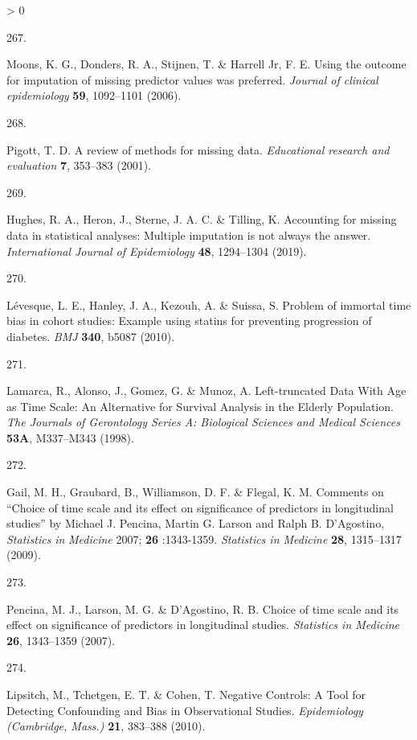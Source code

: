 \documentclass[a4paper, twoside]{templates/ociamthesis}
\newlength{\cslhangindent}
\newlength{\csllabelwidth}
\newenvironment{CSLReferences}[3] %
 {%
  \setlength{\parindent}{0pt}
  \ifodd #1 \everypar{\setlength{\hangindent}{\cslhangindent}}\ignorespaces\fi
  \ifnum #2 > 0
  \setlength{\parskip}{#2\baselineskip}
  \fi
 }%
 {}
\newcommand{\CSLLeftMargin}[1]{\parbox[t]{\maxof{\widthof{#1}}{\csllabelwidth}}{#1}}
\newcommand{\CSLRightInline}[1]{\parbox[t]{\linewidth - \csllabelwidth}{#1}}
\begin{document}
\begin{CSLReferences}{0}{0}
\leavevmode\hypertarget{ref-moons2006using}{}%
\CSLLeftMargin{267. }
\CSLRightInline{Moons, K. G., Donders, R. A., Stijnen, T. \& Harrell Jr, F. E. Using the outcome for imputation of missing predictor values was preferred. \emph{Journal of clinical epidemiology} \textbf{59}, 1092--1101 (2006).}

\leavevmode\hypertarget{ref-pigott2001review}{}%
\CSLLeftMargin{268. }
\CSLRightInline{Pigott, T. D. A review of methods for missing data. \emph{Educational research and evaluation} \textbf{7}, 353--383 (2001).}

\leavevmode\hypertarget{ref-hughes2019}{}%
\CSLLeftMargin{269. }
\CSLRightInline{Hughes, R. A., Heron, J., Sterne, J. A. C. \& Tilling, K. Accounting for missing data in statistical analyses: Multiple imputation is not always the answer. \emph{International Journal of Epidemiology} \textbf{48}, 1294--1304 (2019).}

\leavevmode\hypertarget{ref-levesque2010}{}%
\CSLLeftMargin{270. }
\CSLRightInline{Lévesque, L. E., Hanley, J. A., Kezouh, A. \& Suissa, S. Problem of immortal time bias in cohort studies: Example using statins for preventing progression of diabetes. \emph{BMJ} \textbf{340}, b5087 (2010).}

\leavevmode\hypertarget{ref-lamarca1998}{}%
\CSLLeftMargin{271. }
\CSLRightInline{Lamarca, R., Alonso, J., Gomez, G. \& Munoz, A. Left-truncated {Data With Age} as {Time Scale}: {An Alternative} for {Survival Analysis} in the {Elderly Population}. \emph{The Journals of Gerontology Series A: Biological Sciences and Medical Sciences} \textbf{53A}, M337--M343 (1998).}

\leavevmode\hypertarget{ref-gail2009}{}%
\CSLLeftMargin{272. }
\CSLRightInline{Gail, M. H., Graubard, B., Williamson, D. F. \& Flegal, K. M. Comments on {``{Choice} of time scale and its effect on significance of predictors in longitudinal studies''} by {Michael J}. {Pencina}, {Martin G}. {Larson} and {Ralph B}. {D}'{Agostino}, {\emph{Statistics}}{ \emph{in} }{\emph{Medicine}} 2007; {\textbf{26}} :1343-1359. \emph{Statistics in Medicine} \textbf{28}, 1315--1317 (2009).}

\leavevmode\hypertarget{ref-pencina2007}{}%
\CSLLeftMargin{273. }
\CSLRightInline{Pencina, M. J., Larson, M. G. \& D'Agostino, R. B. Choice of time scale and its effect on significance of predictors in longitudinal studies. \emph{Statistics in Medicine} \textbf{26}, 1343--1359 (2007).}

\leavevmode\hypertarget{ref-lipsitch2010}{}%
\CSLLeftMargin{274. }
\CSLRightInline{Lipsitch, M., Tchetgen, E. T. \& Cohen, T. Negative {Controls}: {A Tool} for {Detecting Confounding} and {Bias} in {Observational Studies}. \emph{Epidemiology (Cambridge, Mass.)} \textbf{21}, 383--388 (2010).}


\end{CSLReferences}
\end{document}
